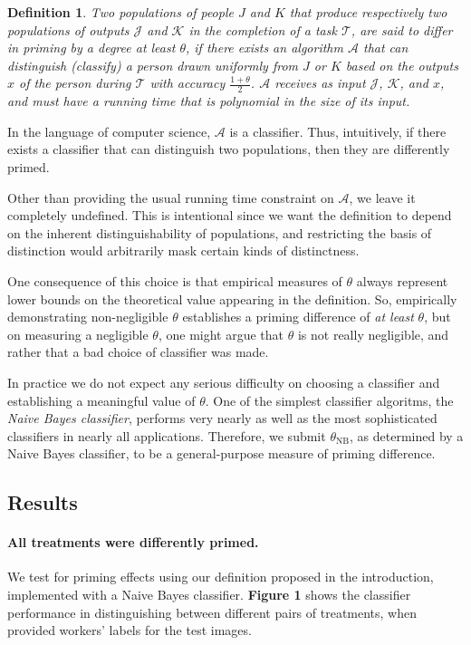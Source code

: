 \documentclass[a4paper]{report}
\newtheorem*{mydef}{Definition}
\begin{document}
\begin{mydef}
	Two populations of people $J$ and $K$ that produce respectively two 
	populations of outputs $\mathcal{J}$ and $\mathcal{K}$ in the completion
	of a task $\mathcal{T}$, are said to \emph{differ in priming by 
	a degree at least $\theta$}, if there exists an algorithm $\mathcal{A}$ 
	that can distinguish (classify)
	a person drawn uniformly from $J$ or $K$ based on the outputs $x$ of the 
	person during $\mathcal{T}$ with accuracy $\frac{1+\theta}{2}$.
	$\mathcal{A}$ receives as input $\mathcal{J}$, $\mathcal{K}$, and $x$,
	and must have a running time that is polynomial in the size of its input.
\end{mydef}

In the language of computer science, $\mathcal{A}$ is a classifier.  Thus,
intuitively, if there exists a classifier that can distinguish two populations,
then they are differently primed.

Other than providing the usual running time constraint on $\mathcal{A}$, we
leave it completely undefined.  This is intentional since we want the 
definition to depend on the inherent distinguishability of populations, and
restricting the basis of distinction would arbitrarily mask certain kinds of
distinctness.

One consequence of this choice is that empirical measures of $\theta$ always
represent lower bounds on the theoretical value appearing in the definition.
So, empirically demonstrating non-negligible $\theta$ establishes a priming 
difference of \textit{at least} $\theta$, but on measuring a negligible 
$\theta$, one might argue that $\theta$ is not really negligible, and rather 
that a bad choice of classifier was made.

In practice we do not expect any serious difficulty on choosing a classifier
and establishing a meaningful value of $\theta$.  One of the simplest 
classifier algoritms, the \textit{Naive Bayes classifier}, performs very 
nearly as well as the most sophisticated classifiers in nearly all 
applications.  Therefore, we submit $\theta_\text{NB}$, as determined by a 
Naive Bayes classifier, to be a general-purpose measure of priming difference.

\subsection*{Results}
\paragraph{All treatments were differently primed.}
We test for priming effects using our definition proposed in the introduction,
implemented with a Naive Bayes classifier.  \textbf{Figure 1} shows
the classifier performance in distinguishing between different pairs of 
treatments, when provided workers' labels for the test images.
\end{document}
